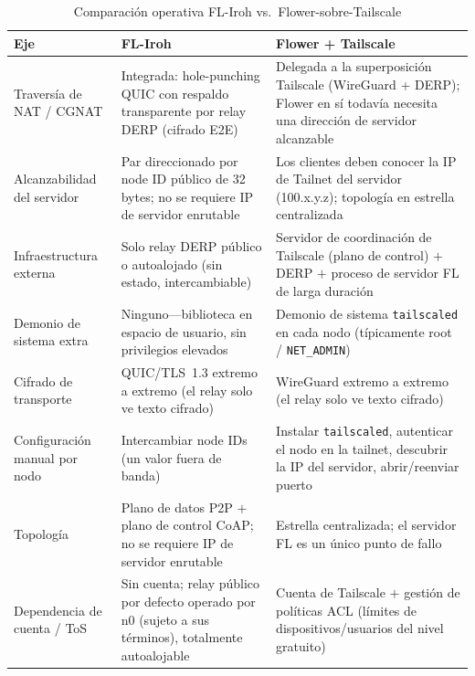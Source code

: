 \documentclass[journal]{IEEEtran}
\begin{document}
\begin{table}[t]
\centering
\caption{Comparación operativa FL-Iroh vs.\ Flower-sobre-Tailscale}
\label{tab:e7}
\footnotesize
\renewcommand{\arraystretch}{1.25}
\begin{tabular}{p{2.5cm} p{6.3cm} p{6.3cm}}
\toprule
\textbf{Eje} & \textbf{FL-Iroh} & \textbf{Flower + Tailscale} \\
\midrule
Traversía de NAT / CGNAT & Integrada: hole-punching QUIC con respaldo transparente por relay DERP (cifrado E2E) & Delegada a la superposición Tailscale (WireGuard + DERP); Flower en sí todavía necesita una dirección de servidor alcanzable \\
Alcanzabilidad del servidor & Par direccionado por node ID público de 32 bytes; no se requiere IP de servidor enrutable & Los clientes deben conocer la IP de Tailnet del servidor (100.x.y.z); topología en estrella centralizada \\
Infraestructura externa & Solo relay DERP público o autoalojado (sin estado, intercambiable) & Servidor de coordinación de Tailscale (plano de control) $+$ DERP $+$ proceso de servidor FL de larga duración \\
Demonio de sistema extra & Ninguno---biblioteca en espacio de usuario, sin privilegios elevados & Demonio de sistema \texttt{tailscaled} en cada nodo (típicamente root / \texttt{NET\_ADMIN}) \\
Cifrado de transporte & QUIC/TLS~1.3 extremo a extremo (el relay solo ve texto cifrado) & WireGuard extremo a extremo (el relay solo ve texto cifrado) \\
Configuración manual por nodo & Intercambiar node IDs (un valor fuera de banda) & Instalar \texttt{tailscaled}, autenticar el nodo en la tailnet, descubrir la IP del servidor, abrir/reenviar puerto \\
Topología & Plano de datos P2P $+$ plano de control CoAP; no se requiere IP de servidor enrutable & Estrella centralizada; el servidor FL es un único punto de fallo \\
Dependencia de cuenta / ToS & Sin cuenta; relay público por defecto operado por n0 (sujeto a sus términos), totalmente autoalojable & Cuenta de Tailscale $+$ gestión de políticas ACL (límites de dispositivos/usuarios del nivel gratuito) \\
\bottomrule
\end{tabular}
\end{table}
\end{document}
